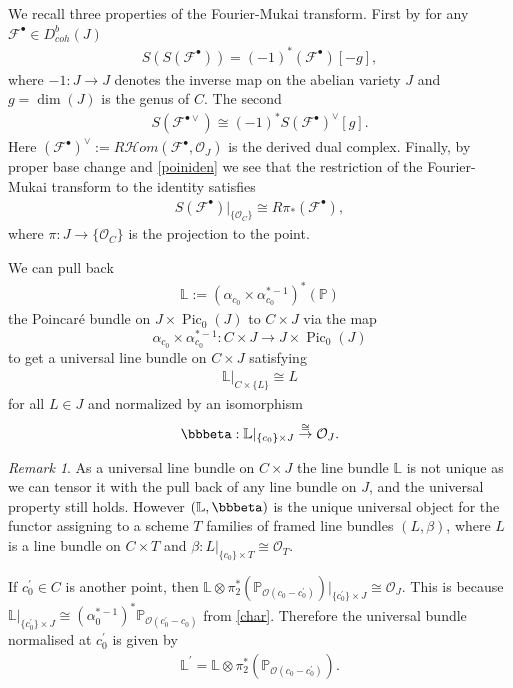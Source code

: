 \documentclass[12pt]{article}
\numberwithin{equation}{section}
\theoremstyle{remark}
\newtheorem{remark}[theorem]{Remark}
\theoremstyle{definition}
\numberwithin{theorem}{section}
\def\beq{\begin{eqnarray}}
\def\eeq{\end{eqnarray}}
\def\bP{{\mathbb P}}
\DeclareMathOperator{\Pic}{Pic}
\def\L{\mathbb{L}}
\def\calF{{\mathcal{F}}}
\def\calO{{\mathcal O}}
\renewcommand{\1}{\mathbbm{1}}
\begin{document}
We recall three properties of the Fourier-Mukai transform. First by \cite[Theorem 3.13.1]{mukai} for any $\calF^\bullet \in D^b_{coh}(J)$ \beq \label{skewinv} S(S(\calF^\bullet))=(-1)^*(\calF^\bullet )[-g], \eeq where $-1:J\to J$ denotes the inverse map on the abelian variety $J$ and $g=\dim(J)$ is the genus of $C$.   The  second \cite[Theorem 3.13.4]{mukai} \beq \label{skewdual}  S(\calF^{\bullet\vee}) \cong (-1)^*S(\calF^\bullet)^\vee [g].\eeq Here $(\calF^\bullet)^\vee:=R{\mathcal Hom}(\calF^\bullet,\calO_J)$ is the derived dual complex. Finally, by proper base change and \eqref{poiniden} we see that the  restriction of the Fourier-Mukai transform to the identity satisfies \beq \label{fmiden} S(\calF^\bullet)|_{\{\calO_C\}}\cong R\pi_*(\calF^\bullet), \eeq
where $\pi:J\to \{\calO_C\}$ is the projection to the point. 

We can pull back \beq \label{univlambda}\L:=(\alpha_{c_0}\times \alpha_{c_0}^{*-1})^*(\bP)\eeq the Poincar\'e bundle on $J\times \Pic_0(J)$ to $C\times J$ via the map $$\alpha_{c_0}\times \alpha_{c_0}^{*-1}:C\times J\to J\times \Pic_0(J)$$ to get a universal line bundle on $C\times J$ satisfying \beq \label{univl}\L|_{C\times \{L\}}\cong L\eeq for all $L\in J$ and normalized
by an isomorphism \beq\label{normalize} \bbbeta:\L|_{\{c_0\}\times J}\stackrel{\cong}{\to}\calO_{J}.\eeq

\begin{remark} \label{framedjacobian} As a universal line bundle on $C\times J$  the line bundle $\L$ is not unique as we can tensor it with the pull back of any line bundle on $J$, and the universal property still holds. However
	$(\L,\bbbeta)$ is the unique universal object for the functor assigning to a scheme $T$  families of framed line bundles $(L,\beta)$, where $L$ is a line bundle on $C\times T$ and $\beta:L|_{\{c_0\}\times T}\cong \calO_T$. 

If $c^\prime_0\in C$ is another point, then $\L\otimes \pi_2^*\left(\bP_{\calO(c_0-c^\prime_0)}\right)|_{\{c^\prime_0\}\times J}\cong \calO_J$.  This is because  $\L|_{\{c^\prime_0\}\times J}\cong (\alpha_0^{*-1})^*\bP_{\calO(c^\prime_0-c_0)}$ from \eqref{char}. Therefore the universal bundle normalised at $c^\prime_0$ is given by \beq \label{changenorm} \L^\prime=\L\otimes \pi_2^*\left(\bP_{\calO(c_0-c^\prime_0)}\right). \eeq 
\end{remark}

\end{document}
